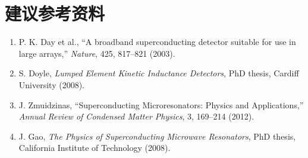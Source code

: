 \documentclass[11pt,a4paper,openany]{ctexrep}
\begin{document}
\chapter*{建议参考资料}
\begin{enumerate}
  \item P. K. Day et al., ``A broadband superconducting detector suitable for use in large arrays,'' \textit{Nature}, 425, 817--821 (2003).
  \item S. Doyle, \textit{Lumped Element Kinetic Inductance Detectors}, PhD thesis, Cardiff University (2008).
  \item J. Zmuidzinas, ``Superconducting Microresonators: Physics and Applications,'' \textit{Annual Review of Condensed Matter Physics}, 3, 169--214 (2012).
  \item J. Gao, \textit{The Physics of Superconducting Microwave Resonators}, PhD thesis, California Institute of Technology (2008).
\end{enumerate}
\end{document}
